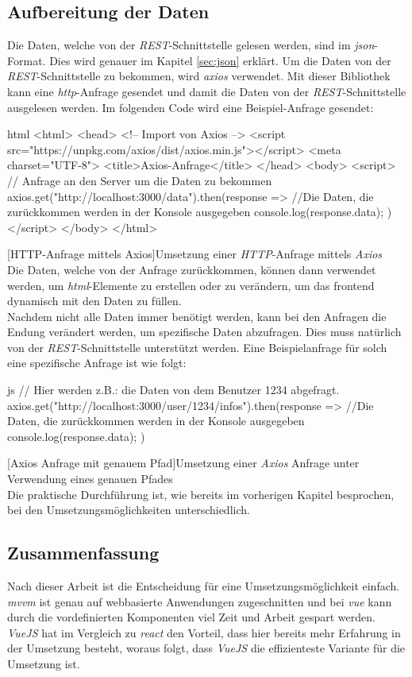 \subsection{Aufbereitung der Daten}
Die Daten, welche von der \textit{REST}-Schnittstelle gelesen werden, sind im \textit{\Gls{json}}-Format. Dies wird genauer im Kapitel \autoref{sec:json} erklärt. Um die Daten von der \textit{REST}-Schnittstelle zu bekommen, wird \textit{\Gls{axios}} verwendet. Mit dieser Bibliothek kann eine \textit{\Gls{http}}-Anfrage gesendet und damit die Daten von der \textit{REST}-Schnittstelle ausgelesen werden. Im folgenden Code wird eine Beispiel-Anfrage gesendet:
\begin{code}{html}
	<html>
		<head>
			<!-- Import von Axios -->
			<script src="https://unpkg.com/axios/dist/axios.min.js"></script>
			<meta charset="UTF-8">
			<title>Axios-Anfrage</title>
		</head>
		<body>
			<script>
				// Anfrage an den Server um die Daten zu bekommen
				axios.get("http://localhost:3000/data").then(response => {
					//Die Daten, die zurückkommen werden in der Konsole ausgegeben
					console.log(response.data);
				})
			</script>
		</body>
	</html>
\end{code}
[HTTP-Anfrage mittels Axios]{Umsetzung einer \textit{HTTP}-Anfrage mittels \textit{Axios}}~\\
Die Daten, welche von der Anfrage zurückkommen, können dann verwendet werden, um \textit{\Gls{html}}-Elemente zu erstellen oder zu verändern, um das \Gls{frontend} dynamisch mit den Daten zu füllen.\\Nachdem nicht alle Daten immer benötigt werden, kann bei den Anfragen die Endung verändert werden, um spezifische Daten abzufragen. Dies muss natürlich von der \textit{REST}-Schnittstelle unterstützt werden. Eine Beispielanfrage für solch eine spezifische Anfrage ist wie folgt:
\begin{code}{js}
	// Hier werden z.B.: die Daten von dem Benutzer 1234 abgefragt.
	axios.get("http://localhost:3000/user/1234/infos").then(response => {
		//Die Daten, die zurückkommen werden in der Konsole ausgegeben
		console.log(response.data);
	})
\end{code}
[Axios Anfrage mit genauem Pfad]{Umsetzung einer \textit{Axios} Anfrage unter Verwendung eines genauen Pfades}~\\
Die praktische Durchführung ist, wie bereits im vorherigen Kapitel besprochen, bei den Umsetzungsmöglichkeiten unterschiedlich.
\subsection{Zusammenfassung}
\label{sec:rfoster_fazit}
Nach dieser Arbeit ist die Entscheidung für eine Umsetzungsmöglichkeit einfach. \textit{\Gls{mvvm}} ist genau auf webbasierte Anwendungen zugeschnitten und bei \textit{\Gls{vue}} kann durch die vordefinierten Komponenten viel Zeit und Arbeit gespart werden. \textit{VueJS} hat im Vergleich zu \textit{\Gls{react}} den Vorteil, dass hier bereits mehr Erfahrung in der Umsetzung besteht, woraus folgt, dass \textit{VueJS} die effizienteste Variante für die Umsetzung ist.